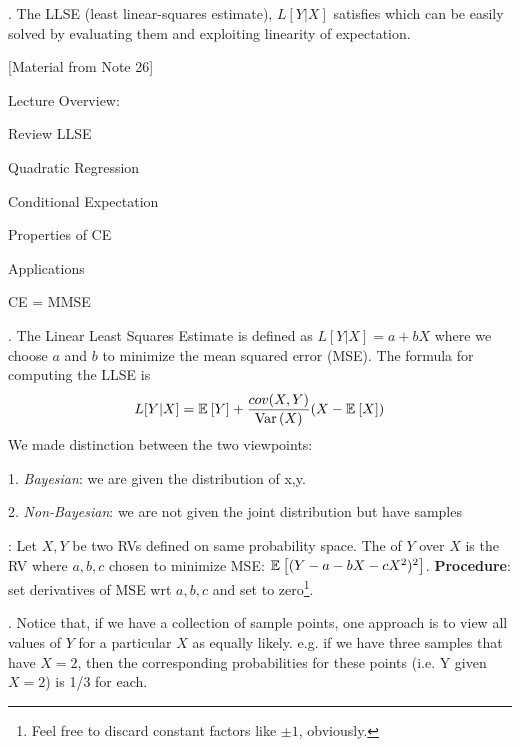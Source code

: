 \documentclass[12pt]{article}
\newcommand{\myspace}{\vspace{2\bigskipamount}}
\newcommand\p{\Needspace{12\baselineskip} \noindent}
\begin{document}
\myspace
\p {}. The LLSE (least linear-squares estimate), $L[Y|X]$ satisfies
which can be easily solved by evaluating them and exploiting linearity of expectation. 



[Material from Note 26]

\p Lecture Overview:
\begin{compactitem}
	\item Review LLSE
	\item Quadratic Regression
	\item Conditional Expectation
	\item Properties of CE
	\item Applications
	\item CE = MMSE
\end{compactitem}

\myspace
\p {}. The Linear Least Squares Estimate is defined as $L[Y | X] = a + bX$ where we choose $a$ and $b$ to minimize the mean squared error (MSE). The formula for computing the LLSE is 
\begin{align}
L[Y | X] = \mathbb{E}_{}\left[Y\right] + \frac{cov(X, Y)}{\text{Var}\left(X \right)} (X - \mathbb{E}_{}\left[X\right])
\end{align}
We made distinction between the two viewpoints:
\begin{compactitem}
	\item[1.] \textit{Bayesian}: we are given the distribution of x,y. 
	\item[2.] \textit{Non-Bayesian}: we are not given the joint distribution but have samples 
\end{compactitem}  


\myspace
\p {}: Let $X, Y$ be two RVs defined on same probability space. The  of $Y$ over $X$ is the RV
where $a, b, c$ chosen to minimize MSE: $\mathbb{E}_{}\left[(Y - a - bX - cX^2)^2\right]$. \textbf{Procedure}: set derivatives of MSE wrt $a,b,c$ and set to zero\footnote{Feel free to discard constant factors like $\pm 1$, obviously.}.


\myspace
\p {}. Notice that, if we have a collection of sample points, one approach is to view all values of $Y$ for a particular $X$ as equally likely. e.g. if we have three samples that have $X = 2$, then the corresponding probabilities for these points (i.e. Y given $X = 2$) is 1/3 for each. \\
\end{document}
